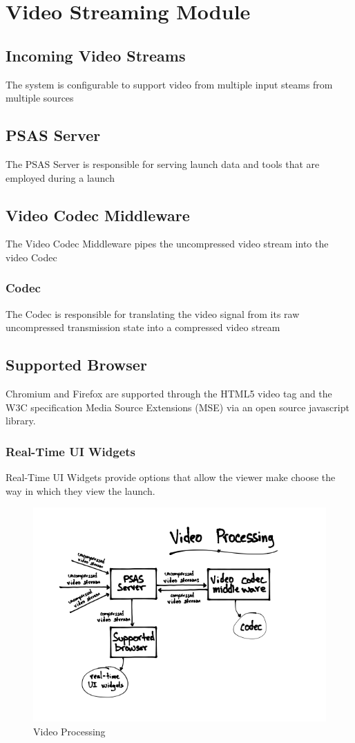 \section{Video Streaming Module}

\subsection{Incoming Video Streams}
The system is configurable to support video from multiple input steams from multiple sources

\subsection{PSAS Server}
The PSAS Server is responsible for serving launch data and tools that are
employed during a launch

\subsection{Video Codec Middleware}
The Video Codec Middleware pipes the uncompressed video stream into the video Codec

\subsubsection{Codec}
The Codec is responsible for translating the video signal from its raw uncompressed transmission 
state into a compressed video stream

\subsection{Supported Browser}
Chromium and Firefox are supported through the HTML5 video tag and the W3C specification Media 
Source Extensions (MSE) via an open source javascript library.

\subsubsection{Real-Time UI Widgets}
Real-Time UI Widgets provide options that allow the viewer make choose the way
in which they view the launch.

\begin{figure}
  \centering
  \includegraphics{imgs/VideoProcessing.png}
  \caption{Video Processing}
\end{figure}
